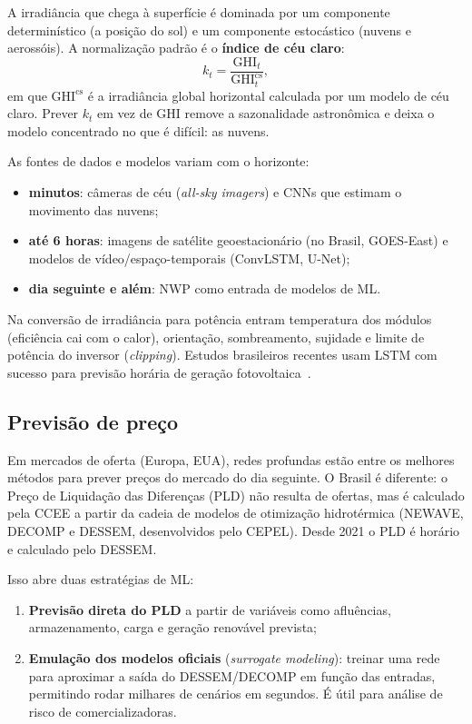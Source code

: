 \documentclass[10pt,a4paper,oneside]{article}
\begin{document}
A irradiância que chega à superfície é dominada por um componente
determinístico (a posição do sol) e um componente estocástico (nuvens e
aerossóis). A normalização padrão é o \textbf{índice de céu claro}:
\begin{equation}
  k_t = \frac{\mathrm{GHI}_t}{\mathrm{GHI}^{\mathrm{cs}}_t},
\end{equation}
em que $\mathrm{GHI}^{\mathrm{cs}}$ é a irradiância global horizontal
calculada por um modelo de céu claro. Prever $k_t$ em vez de GHI remove a
sazonalidade astronômica e deixa o modelo concentrado no que é difícil: as
nuvens.

As fontes de dados e modelos variam com o horizonte:
\begin{itemize}
  \item \textbf{minutos}: câmeras de céu (\textit{all-sky imagers}) e CNNs que
    estimam o movimento das nuvens;
  \item \textbf{até 6 horas}: imagens de satélite geoestacionário (no Brasil,
    GOES-East) e modelos de vídeo/espaço-temporais (ConvLSTM, U-Net);
  \item \textbf{dia seguinte e além}: NWP como entrada de modelos de ML.
\end{itemize}

Na conversão de irradiância para potência entram temperatura dos módulos
(eficiência cai com o calor), orientação, sombreamento, sujidade e limite de
potência do inversor (\textit{clipping}). Estudos brasileiros recentes usam
LSTM com sucesso para previsão horária de geração fotovoltaica~\cite{pvlstm}.

\subsection{Previsão de preço}

Em mercados de oferta (Europa, EUA), redes profundas estão entre os melhores
métodos para prever preços do mercado do dia seguinte. O Brasil é diferente: o
Preço de Liquidação das Diferenças (PLD) não resulta de ofertas, mas é
calculado pela CCEE a partir da cadeia de modelos de otimização
hidrotérmica (NEWAVE, DECOMP e DESSEM, desenvolvidos pelo CEPEL). Desde 2021 o
PLD é horário e calculado pelo DESSEM.

Isso abre duas estratégias de ML:
\begin{enumerate}
  \item \textbf{Previsão direta do PLD} a partir de variáveis como afluências,
    armazenamento, carga e geração renovável prevista;
  \item \textbf{Emulação dos modelos oficiais} (\textit{surrogate modeling}):
    treinar uma rede para aproximar a saída do DESSEM/DECOMP em função das
    entradas, permitindo rodar milhares de cenários em segundos. É útil para
    análise de risco de comercializadoras.
\end{enumerate}
\end{document}
